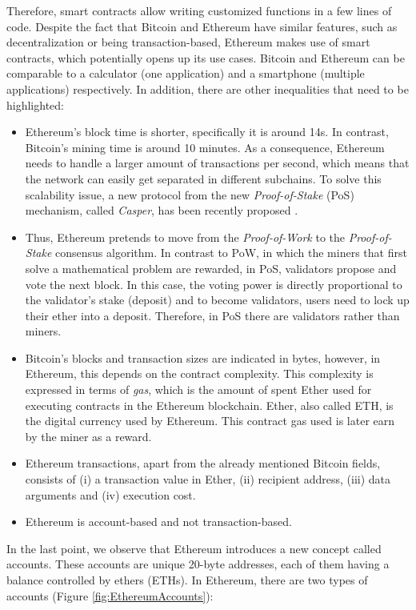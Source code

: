 Therefore, smart contracts allow writing customized functions in a few lines of code. Despite the fact that Bitcoin and Ethereum have similar features, such as decentralization or being transaction-based, Ethereum makes use of smart contracts, which potentially opens up its use cases. Bitcoin and Ethereum can be comparable to a calculator (one application) and a smartphone (multiple applications) respectively. In addition, there are other inequalities that need to be highlighted:

\begin{itemize}
	
	\item Ethereum's block time is shorter, specifically it is around 14s. In contrast, Bitcoin's mining time is around 10 minutes. As a consequence, Ethereum needs to handle a larger amount of transactions per second, which means that the network can easily get separated in different subchains. To solve this scalability issue, a new protocol from the new \textit{Proof-of-Stake} (PoS) mechanism, called  \textit{Casper}, has been recently proposed \cite{proofOfStake}.
	\item Thus, Ethereum pretends to move from the \textit{Proof-of-Work} to the \textit{Proof-of-Stake} consensus algorithm. In contrast to PoW, in which the miners that first solve a mathematical problem are rewarded, in PoS, validators propose and vote the next block. In this case, the voting power is directly proportional to the validator's stake (deposit) and to become validators, users need to lock up their ether into a deposit. Therefore, in PoS there are validators rather than miners.
	\item Bitcoin's blocks and transaction sizes are indicated in bytes, however, in Ethereum, this depends on the contract complexity. This complexity is expressed in terms of \textit{gas}, which is the amount of spent Ether used for executing contracts in the Ethereum blockchain. Ether, also called ETH, is the digital currency used by Ethereum. This contract gas used is later earn by the miner as a reward.
	\item Ethereum transactions, apart from the already mentioned Bitcoin fields, consists of (i) a transaction value in Ether, (ii) recipient address, (iii) data arguments and (iv) execution cost.
	\item Ethereum is account-based and not transaction-based.
\end{itemize}
In the last point, we observe that Ethereum introduces a new concept called accounts. These accounts are unique 20-byte addresses, each of them having a balance controlled by ethers (ETHs). In Ethereum, there are two types of accounts (Figure \ref{fig:EthereumAccounts}):

